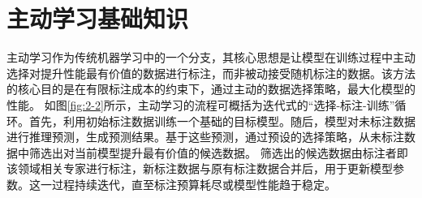 \section{主动学习基础知识}
主动学习作为传统机器学习中的一个分支，其核心思想是让模型在训练过程中主动选择对提升性能最有价值的数据进行标注，而非被动接受随机标注的数据。该方法的核心目的是在有限标注成本的约束下，通过主动的数据选择策略，最大化模型的性能。%
如图\ref{fig:2-2}所示，主动学习的流程可概括为迭代式的“选择-标注-训练”循环。首先，利用初始标注数据训练一个基础的目标模型。随后，模型对未标注数据进行推理预测，生成预测结果。基于这些预测，通过预设的选择策略，从未标注数据中筛选出对当前模型提升最有价值的候选数据。%
筛选出的候选数据由标注者即该领域相关专家进行标注，新标注数据与原有标注数据合并后，用于更新模型参数。这一过程持续迭代，直至标注预算耗尽或模型性能趋于稳定。

